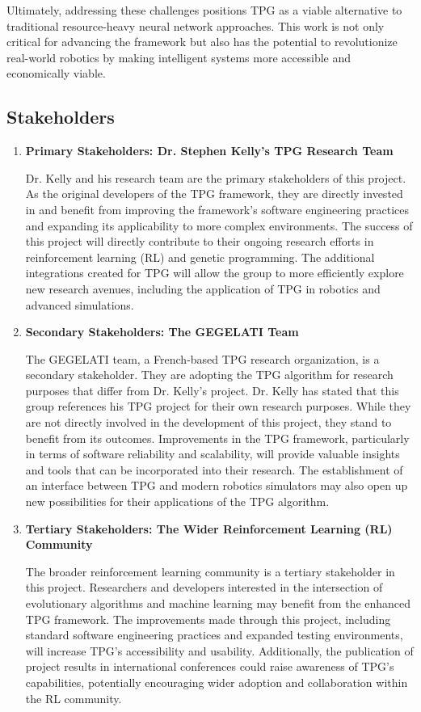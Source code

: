 \documentclass{article}
\begin{document}
Ultimately, addressing these challenges positions TPG as a viable alternative to traditional resource-heavy neural network approaches. This work is not only critical for advancing the framework but also has the potential to revolutionize real-world robotics by making intelligent systems more accessible and economically viable.

\subsection{Stakeholders}

\begin{enumerate} [leftmargin=*]

  \item \textbf{Primary Stakeholders: Dr. Stephen Kelly’s TPG Research Team}

    Dr. Kelly and his research team are the primary stakeholders of this project. As the original developers of the TPG framework, they are directly invested in and benefit from improving the framework’s software engineering practices and expanding its applicability to more complex environments. The success of this project will directly contribute to their ongoing research efforts in reinforcement learning (RL) and genetic programming. The additional integrations created for TPG will allow the group to more efficiently explore new research avenues, including the application of TPG in robotics and advanced simulations.

\item \textbf{Secondary Stakeholders: The GEGELATI Team}

       The GEGELATI team, a French-based TPG research organization, is a secondary stakeholder. They are adopting the TPG algorithm for research purposes that differ from Dr. Kelly’s project. Dr. Kelly has stated that this group references his TPG project for their own research purposes. While they are not directly involved in the development of this project, they stand to benefit from its outcomes. Improvements in the TPG framework, particularly in terms of software reliability and scalability, will provide valuable insights and tools that can be incorporated into their research. The establishment of an interface between TPG and modern robotics simulators may also open up new possibilities for their applications of the TPG algorithm.

 \item \textbf{Tertiary Stakeholders: The Wider Reinforcement Learning (RL) Community}

         The broader reinforcement learning community is a tertiary stakeholder in this project. Researchers and developers interested in the intersection of evolutionary algorithms and machine learning may benefit from the enhanced TPG framework. The improvements made through this project, including standard software engineering practices and expanded testing environments, will increase TPG’s accessibility and usability. Additionally, the publication of project results in international conferences could raise awareness of TPG’s capabilities, potentially encouraging wider adoption and collaboration within the RL community.


\end{enumerate}
\end{document}
